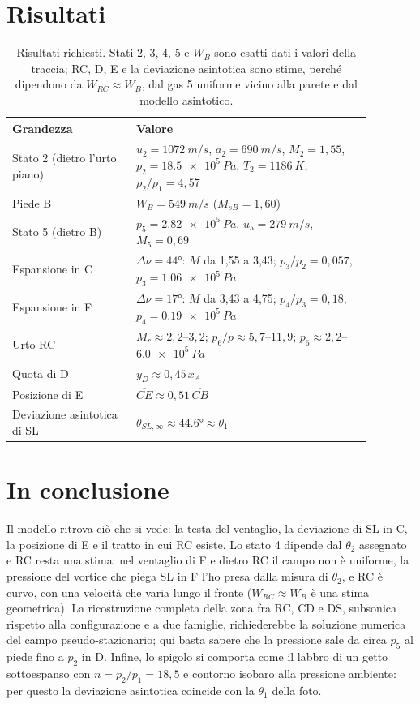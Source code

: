 \section*{Risultati}
\begin{table}[H]
\centering\small
\begin{tabular}{p{0.3\linewidth}p{0.58\linewidth}}
\toprule
Grandezza & Valore \\
\midrule
Stato 2 (dietro l'urto piano) & $u_2=\SI{1072}{m/s}$, $a_2=\SI{690}{m/s}$, $M_2=1{,}55$, $p_2=\SI{18.5e5}{Pa}$,
  $T_2=\SI{1186}{K}$, $\rho_2/\rho_1=4{,}57$ \\
Piede B & $W_B=\SI{549}{m/s}$ ($M_{sB}=1{,}60$) \\
Stato 5 (dietro B) & $p_5=\SI{2.82e5}{Pa}$, $u_5=\SI{279}{m/s}$, $M_5=0{,}69$ \\
Espansione in C & $\Delta\nu=\ang{44}$: $M$ da 1,55 a 3,43; $p_3/p_2=0{,}057$, $p_3=\SI{1.06e5}{Pa}$ \\
Espansione in F & $\Delta\nu=\ang{17}$: $M$ da 3,43 a 4,75; $p_4/p_3=0{,}18$, $p_4=\SI{0.19e5}{Pa}$ \\
Urto RC & $M_r\approx2{,}2$--$3{,}2$; $p_6/p\approx5{,}7$--$11{,}9$; $p_6\approx2{,}2$--$\SI{6.0e5}{Pa}$ \\
Quota di D & $y_D\approx0{,}45\,x_A$ \\
Posizione di E & $\overline{CE}\approx0{,}51\,\overline{CB}$ \\
Deviazione asintotica di SL & $\theta_{SL,\infty}\approx\ang{44.6}\approx\theta_1$ \\
\bottomrule
\end{tabular}
\caption{Risultati richiesti. Stati 2, 3, 4, 5 e $W_B$ sono esatti dati i valori della traccia; RC, D, E e la
deviazione asintotica sono stime, perché dipendono da $W_{RC}\approx W_B$, dal gas 5 uniforme vicino alla parete e
dal modello asintotico.}
\end{table}

\section*{In conclusione}
Il modello ritrova ciò che si vede: la testa del ventaglio, la deviazione di SL in C, la posizione di E e il tratto in
cui RC esiste. Lo stato 4 dipende dal $\theta_2$ assegnato e RC resta una stima: nel ventaglio di F e dietro RC il campo non è uniforme, la pressione del
vortice che piega SL in F l'ho presa dalla misura di $\theta_2$, e RC è curvo, con una velocità che varia lungo il
fronte ($W_{RC}\approx W_B$ è una stima geometrica). La ricostruzione completa della zona fra RC, CD e DS, subsonica
rispetto alla configurazione e a due famiglie, richiederebbe la soluzione numerica del campo pseudo-stazionario; qui
basta sapere che la pressione sale da circa $p_5$ al piede fino a $p_2$ in D. Infine, lo spigolo si comporta come il
labbro di un getto sottoespanso con $n=p_2/p_1=18{,}5$ e contorno isobaro alla pressione ambiente: per questo la
deviazione asintotica coincide con la $\theta_1$ della foto.



